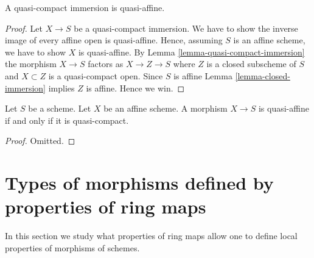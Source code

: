 \begin{lemma}
\label{lemma-quasi-compact-immersion-quasi-affine}
A quasi-compact immersion is quasi-affine.
\end{lemma}

\begin{proof}
Let $X \to S$ be a quasi-compact immersion. We have to show the
inverse image of every affine open is quasi-affine. Hence,
assuming $S$ is an affine scheme, we have to show
$X$ is quasi-affine. By Lemma \ref{lemma-quasi-compact-immersion}
the morphism $X \to S$ factors as $X \to Z \to S$ where $Z$ is a closed
subscheme of $S$ and $X \subset Z$ is a quasi-compact open.
Since $S$ is affine Lemma \ref{lemma-closed-immersion} implies
$Z$ is affine. Hence we win.
\end{proof}

\begin{lemma}
\label{lemma-affine-quasi-affine}
Let $S$ be a scheme. Let $X$ be an affine scheme.
A morphism $X \to S$ is quasi-affine
if and only if it is quasi-compact.
\end{lemma}

\begin{proof}
Omitted.
\end{proof}












\section{Types of morphisms defined by properties of ring maps}
\label{section-properties-ring-maps}

\noindent
In this section we study what properties of ring maps
allow one to define local properties of morphisms of schemes.

